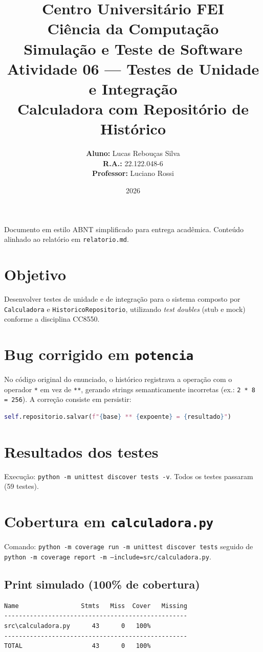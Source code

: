 \documentclass[11pt,a4paper]{article}
\title{
    {\Large \textbf{Centro Universitário FEI}}\\
    \vspace{0.3cm}
    {\large Ciência da Computação}\\[0.8cm]
    {\LARGE \textbf{Simulação e Teste de Software}}\\[0.3cm]
    {\Large Atividade 06 --- Testes de Unidade e Integração}\\[0.8cm]
    {\large \textbf{Calculadora com Repositório de Histórico}}
}
\author{
    \textbf{Aluno:} Lucas Rebouças Silva\\
    \textbf{R.A.:} 22.122.048-6\\[0.4cm]
    \textbf{Professor:} Luciano Rossi
}
\date{2026}
\begin{document}
\maketitle
\thispagestyle{empty}
\vspace{1cm}
\begin{center}
\small
Documento em estilo ABNT simplificado para entrega acadêmica. Conteúdo alinhado ao relatório em \texttt{relatorio.md}.
\end{center}
\newpage
\setcounter{page}{1}

\section{Objetivo}
Desenvolver testes de unidade e de integração para o sistema composto por \texttt{Calculadora} e \texttt{HistoricoRepositorio}, utilizando \emph{test doubles} (stub e mock) conforme a disciplina CC8550.

\section{Bug corrigido em \texttt{potencia}}
No código original do enunciado, o histórico registrava a operação com o operador \texttt{*} em vez de \texttt{**}, gerando strings semanticamente incorretas (ex.: \texttt{2 * 8 = 256}). A correção consiste em persistir:
\begin{lstlisting}[language=Python]
self.repositorio.salvar(f"{base} ** {expoente} = {resultado}")
\end{lstlisting}

\section{Resultados dos testes}
Execução: \texttt{python -m unittest discover tests -v}. Todos os testes passaram (59 testes).

\section{Cobertura em \texttt{calculadora.py}}
Comando: \texttt{python -m coverage run -m unittest discover tests} seguido de \texttt{python -m coverage report -m --include=src/calculadora.py}.

\subsection{Print simulado (100\% de cobertura)}
\begin{lstlisting}
Name                 Stmts   Miss  Cover   Missing
--------------------------------------------------
src\calculadora.py      43      0   100%
--------------------------------------------------
TOTAL                   43      0   100%
\end{lstlisting}
\end{document}
